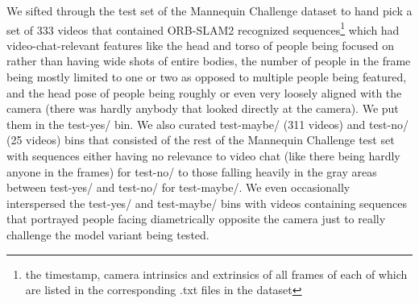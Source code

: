 We sifted through the test set of the Mannequin Challenge dataset to hand pick a set of 333 videos that contained ORB-SLAM2 recognized sequences\footnote{the timestamp, camera intrinsics and extrinsics of all frames of each of which are listed in the corresponding .txt files in the dataset} which had video-chat-relevant features like the head and torso of people being focused on rather than having wide shots of entire bodies, the number of people in the frame being mostly limited to one or two as opposed to multiple people being featured, and the head pose of people being roughly or even very loosely aligned with the camera (there was hardly anybody that looked directly at the camera). We put them in the test-yes/ bin. We also curated test-maybe/ (311 videos) and test-no/ (25 videos) bins that consisted of the rest of the Mannequin Challenge test set with sequences either having no relevance to video chat (like there being hardly anyone in the frames) for test-no/ to those falling heavily in the gray areas between test-yes/ and test-no/ for test-maybe/. We even occasionally interspersed the test-yes/ and test-maybe/ bins with videos containing sequences that portrayed people facing diametrically opposite the camera just to really challenge the model variant being tested.

